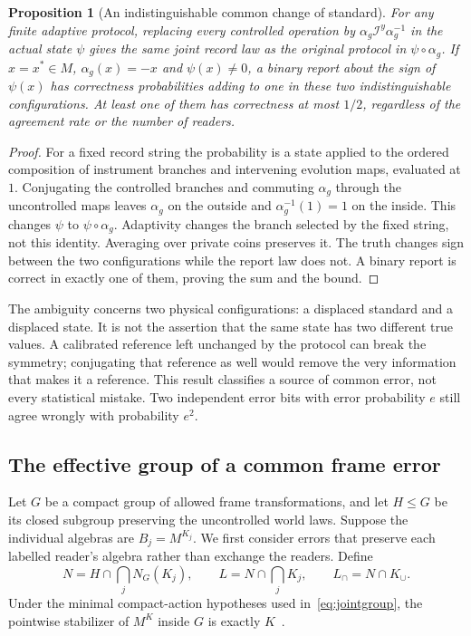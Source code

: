 \documentclass[12pt]{article}
\newtheorem{proposition}[theorem]{Proposition}
\theoremstyle{definition}
\theoremstyle{remark}
\begin{document}
\begin{proposition}[An indistinguishable common change of standard]
\label{prop:recordcovariance}
For any finite adaptive protocol, replacing every controlled operation by
$\alpha_g\mathcal I^y\alpha_g^{-1}$ in the actual state $\psi$ gives the same
joint record law as the original protocol in $\psi\circ\alpha_g$.
If $x=x^*\in M$, $\alpha_g(x)=-x$ and $\psi(x)\ne0$, a binary report about the
sign of $\psi(x)$ has correctness probabilities adding to one in these two
indistinguishable configurations. At least one of them has correctness at most
$1/2$, regardless of the agreement rate or the number of readers.
\end{proposition}
\begin{proof}
For a fixed record string the probability is a state applied to the ordered
composition of instrument branches and intervening evolution maps, evaluated
at $1$. Conjugating the controlled branches and commuting $\alpha_g$ through
the uncontrolled maps leaves $\alpha_g$ on the outside and
$\alpha_g^{-1}(1)=1$ on the inside. This changes $\psi$ to
$\psi\circ\alpha_g$. Adaptivity changes the branch selected by the fixed
string, not this identity. Averaging over private coins preserves it.
The truth changes sign between the two configurations while the report law
does not. A binary report is correct in exactly one of them, proving the sum
and the bound.
\end{proof}

The ambiguity concerns two physical configurations: a displaced standard and
a displaced state. It is not the assertion that the same state has two
different true values. A calibrated reference left unchanged by the protocol
can break the symmetry; conjugating that reference as well would remove the
very information that makes it a reference. This result classifies a source
of common error, not every statistical mistake. Two independent error bits
with error probability $e$ still agree wrongly with probability $e^2$.

\subsection{The effective group of a common frame error}

Let $G$ be a compact group of allowed frame transformations, and let $H\le G$
be its closed subgroup preserving the uncontrolled world laws.
Suppose the individual algebras are $B_j=M^{K_j}$. We first consider errors
that preserve each labelled reader's algebra rather than exchange the readers.
Define
\[
 N=H\cap\bigcap_j N_G(K_j),
 \qquad L=N\cap\bigcap_jK_j,
 \qquad L_\cap=N\cap K_\cup .
\]
Under the minimal compact-action hypotheses used in~\eqref{eq:jointgroup}, the
pointwise stabilizer of $M^K$ inside $G$ is exactly $K$~\cite[Remark~3.17]{ILP1998}.
\end{document}
